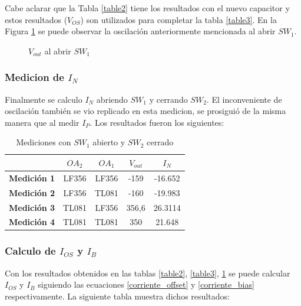 \documentclass[12pt,a4paper]{article}
\begin{document}
Cabe aclarar que la Tabla \ref{table2} tiene los resultados con el nuevo capacitor y estos resultados ($V_{OS}$) son utilizados para completar la tabla \ref{table3}. 
En la Figura \ref{medicion} se puede observar la oscilación anteriormente mencionada al abrir $SW_1$. 

\begin{figure}[h!]                                                       
     \caption{$V_{out}$ al abrir $SW_1$}
     \label{medicion}
     \end{figure}



\subsubsection{Medicion de $I_{N}$}


Finalmente se calculo $I_N$ abriendo $SW_1$ y cerrando $SW_2$. El inconveniente de oscilación también se vio replicado en esta medicion, se prosiguió de la misma manera que al medir $I_P$.  
Los resultados fueron los siguientes:

\begin{table}[ht]
    \centering
    \caption{Mediciones con $SW_1$ abierto y $SW_2$ cerrado}
    \label{table4}
    \begin{tabular}{@{}ccccc@{}}
    \textbf{}           & \textbf{$OA_2$} & \textbf{$OA_1$} & \textbf{$V_{out}$} & \textbf{$I_N$} \\ \midrule
    \textbf{Medición 1} & LF356          & LF356          & -159              &  -16.652            \\
    \textbf{Medición 2} & LF356          & TL081          & -160              &  -19.983            \\
    \textbf{Medición 3} & TL081          & LF356          & 356,6              &  26.3114            \\
    \textbf{Medición 4} & TL081          & TL081          & 350              &  21.648            \\ 
    \end{tabular}
\end{table}


\subsubsection{Calculo de $I_{OS}$ y $I_B$}

Con los resultados obtenidos en las tablas \ref{table2}, \ref{table3}, \ref{table4} se puede calcular $I_{OS}$ y $I_B$ siguiendo las ecuaciones \ref{corriente_offset} y \ref{corriente_bias} respectivamente. La siguiente tabla muestra dichos resultados:
\end{document}
